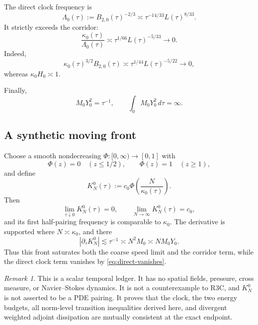 \documentclass[11pt]{article}
\theoremstyle{remark}
\newtheorem{remark}[theorem]{Remark}
\begin{document}
The direct clock frequency is
\[
 \Lambda_0(\tau)
 :=
 B_{2,0}(\tau)^{-2/3}
 \asymp
 \tau^{-14/33}L(\tau)^{8/33}.
\]
It strictly exceeds the corridor:
\begin{equation}
\label{eq:below-clock}
 \frac{\kappa_0(\tau)}{\Lambda_0(\tau)}
 \asymp
 \tau^{1/66}L(\tau)^{-5/33}
 \longrightarrow0.
\end{equation}
Indeed,
\begin{equation}
\label{eq:direct-vanishes}
 \kappa_0(\tau)^{3/2}B_{2,0}(\tau)
 \asymp
 \tau^{1/44}L(\tau)^{-5/22}
 \longrightarrow0,
\end{equation}
whereas \(\kappa_0H_0\asymp1\).

Finally,
\begin{equation}
\label{eq:weighted-divergence}
 M_0Y_0^2=\tau^{-1},
 \qquad
 \int_0M_0Y_0^2\,d\tau=\infty.
\end{equation}

\subsection{A synthetic moving front}

Choose a smooth nondecreasing
\(\Phi:[0,\infty)\to[0,1]\) with
\[
 \Phi(z)=0\quad(z\leq1/2),
 \qquad
 \Phi(z)=1\quad(z\geq1),
\]
and define
\begin{equation}
\label{eq:synthetic-front}
 K_N^0(\tau)
 :=
 c_0\Phi\left(\frac{N}{\kappa_0(\tau)}\right).
\end{equation}
Then
\[
 \lim_{\tau\downarrow0}K_N^0(\tau)=0,
 \qquad
 \lim_{N\to\infty}K_N^0(\tau)=c_0,
\]
and its first half-pairing frequency is comparable to \(\kappa_0\).
The derivative is supported where \(N\asymp\kappa_0\), and there
\begin{equation}
\label{eq:synthetic-speed}
 |\partial_\tau K_N^0|
 \lesssim
 \tau^{-1}
 \asymp
 N^2M_0
 \asymp
 NM_0Y_0.
\end{equation}
Thus this front saturates both the coarse speed limit and the corridor
term, while the direct clock term vanishes by
\eqref{eq:direct-vanishes}.

\begin{remark}
This is a scalar temporal ledger.  It has no spatial fields, pressure,
cross measure, or Navier--Stokes dynamics.  It is not a counterexample
to R3C, and \(K_N^0\) is not asserted to be a PDE pairing.  It proves
that the clock, the two energy budgets, all norm-level transition
inequalities derived here, and divergent weighted adjoint dissipation
are mutually consistent at the exact endpoint.
\end{remark}
\end{document}
